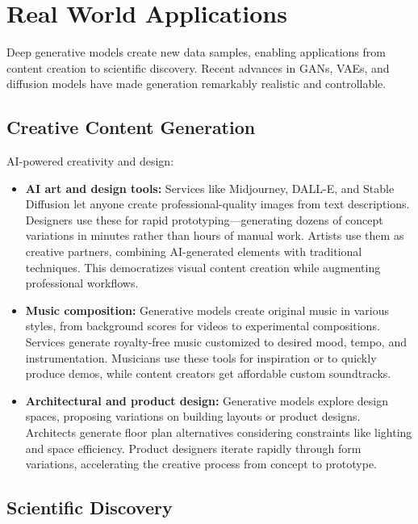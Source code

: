 
\section{Real World Applications}
\label{sec:generative-real-world}


Deep generative models create new data samples, enabling applications from content creation to scientific discovery. Recent advances in GANs, VAEs, and diffusion models have made generation remarkably realistic and controllable.

\subsection{Creative Content Generation}

AI-powered creativity and design:

\begin{itemize}
    \item \textbf{AI art and design tools:} Services like Midjourney, DALL-E, and Stable Diffusion let anyone create professional-quality images from text descriptions. Designers use these for rapid prototyping—generating dozens of concept variations in minutes rather than hours of manual work. Artists use them as creative partners, combining AI-generated elements with traditional techniques. This democratizes visual content creation while augmenting professional workflows.
    
    \item \textbf{Music composition:} Generative models create original music in various styles, from background scores for videos to experimental compositions. Services generate royalty-free music customized to desired mood, tempo, and instrumentation. Musicians use these tools for inspiration or to quickly produce demos, while content creators get affordable custom soundtracks.
    
    \item \textbf{Architectural and product design:} Generative models explore design spaces, proposing variations on building layouts or product designs. Architects generate floor plan alternatives considering constraints like lighting and space efficiency. Product designers iterate rapidly through form variations, accelerating the creative process from concept to prototype.
\end{itemize}

\subsection{Scientific Discovery}

